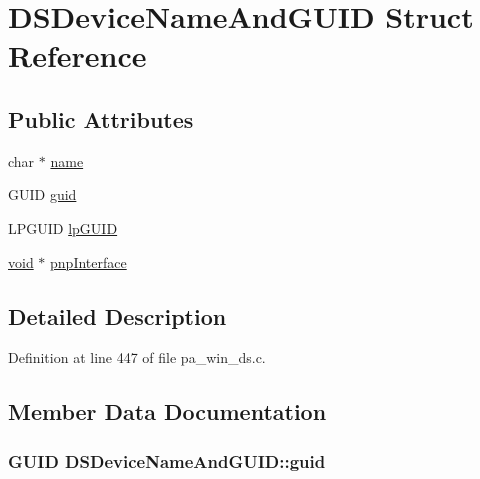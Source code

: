 \hypertarget{struct_d_s_device_name_and_g_u_i_d}{}\section{D\+S\+Device\+Name\+And\+G\+U\+ID Struct Reference}
\label{struct_d_s_device_name_and_g_u_i_d}
\subsection*{Public Attributes}
\begin{DoxyCompactItemize}
\item 
char $\ast$ \hyperlink{struct_d_s_device_name_and_g_u_i_d_aa8ad5e45db7c8b3191cbc7a941f3319c}{name}
\item 
G\+U\+ID \hyperlink{struct_d_s_device_name_and_g_u_i_d_a72c0a5d9955d59289568eaaa37c2a212}{guid}
\item 
L\+P\+G\+U\+ID \hyperlink{struct_d_s_device_name_and_g_u_i_d_a5b90ed2e9ca64d8ceffd5d4f80bca259}{lp\+G\+U\+ID}
\item 
\hyperlink{sound_8c_ae35f5844602719cf66324f4de2a658b3}{void} $\ast$ \hyperlink{struct_d_s_device_name_and_g_u_i_d_acda2e461898368f900fc852495b01c47}{pnp\+Interface}
\end{DoxyCompactItemize}


\subsection{Detailed Description}


Definition at line 447 of file pa\+\_\+win\+\_\+ds.\+c.



\subsection{Member Data Documentation}
\subsubsection[{\texorpdfstring{guid}{guid}}]{\setlength{\rightskip}{0pt plus 5cm}G\+U\+ID D\+S\+Device\+Name\+And\+G\+U\+I\+D\+::guid}\hypertarget{struct_d_s_device_name_and_g_u_i_d_a72c0a5d9955d59289568eaaa37c2a212}{}\label{struct_d_s_device_name_and_g_u_i_d_a72c0a5d9955d59289568eaaa37c2a212}


